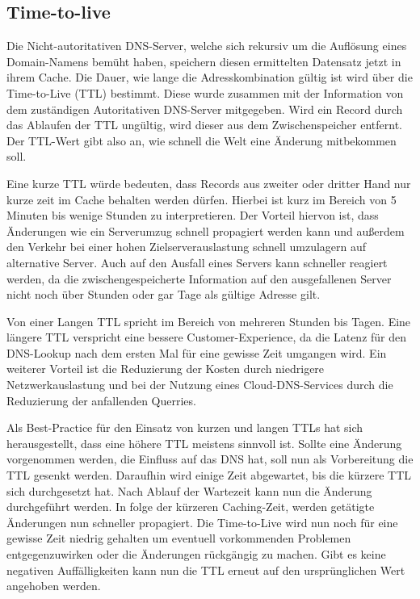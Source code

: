 \subsection{Time-to-live} \label{lab:ttl}
Die Nicht-autoritativen DNS-Server, welche sich rekursiv um die Auflösung eines Domain-Namens bemüht haben, speichern diesen ermittelten Datensatz jetzt in ihrem Cache. Die Dauer, wie lange die Adresskombination gültig ist wird über die Time-to-Live (TTL) bestimmt. Diese wurde zusammen mit der Information von dem zuständigen Autoritativen DNS-Server mitgegeben. Wird ein Record durch das Ablaufen der TTL ungültig, wird dieser aus dem Zwischenspeicher entfernt. Der TTL-Wert gibt also an, wie schnell die Welt eine Änderung mitbekommen soll. 

Eine kurze TTL würde bedeuten, dass Records aus zweiter oder dritter Hand nur kurze zeit im Cache behalten werden dürfen. Hierbei ist kurz im Bereich von 5 Minuten bis wenige Stunden zu interpretieren. Der Vorteil hiervon ist, dass Änderungen wie ein Serverumzug schnell propagiert werden kann und außerdem den Verkehr bei einer hohen Zielserverauslastung schnell umzulagern auf alternative Server. Auch auf den Ausfall eines Servers kann schneller reagiert werden, da die zwischengespeicherte Information auf den ausgefallenen Server nicht noch über Stunden oder gar Tage als gültige Adresse gilt.

Von einer Langen TTL spricht im Bereich von mehreren Stunden bis Tagen. Eine längere TTL verspricht eine bessere Customer-Experience, da die Latenz für den DNS-Lookup nach dem ersten Mal für eine gewisse Zeit umgangen wird. Ein weiterer Vorteil ist die Reduzierung der Kosten durch niedrigere Netzwerkauslastung und bei der Nutzung eines Cloud-DNS-Services durch die Reduzierung der anfallenden Querries.

Als Best-Practice für den Einsatz von kurzen und langen TTLs hat sich herausgestellt, dass eine höhere TTL meistens sinnvoll ist. Sollte eine Änderung vorgenommen werden, die Einfluss auf das DNS hat, soll nun als Vorbereitung die TTL gesenkt werden. Daraufhin wird einige Zeit abgewartet, bis die kürzere TTL sich durchgesetzt hat. Nach Ablauf der Wartezeit kann nun die Änderung durchgeführt werden. In folge der kürzeren Caching-Zeit, werden getätigte Änderungen nun schneller propagiert. Die Time-to-Live wird nun noch für eine gewisse Zeit niedrig gehalten um eventuell vorkommenden Problemen entgegenzuwirken oder die Änderungen rückgängig zu machen. Gibt es keine negativen Auffälligkeiten kann nun die TTL erneut auf den ursprünglichen Wert angehoben werden.

